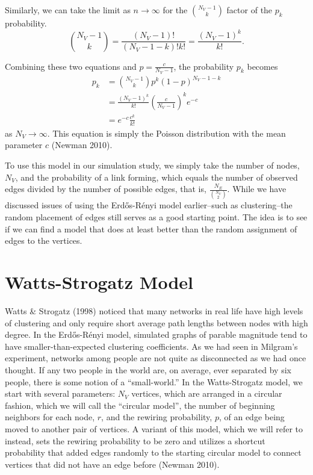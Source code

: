 \documentclass[12pt,twoside]{amherstthesis}
\begin{document}
  Similarly, we can take the limit as \(n \to \infty\) for the
  \({N_{V} - 1 \choose k}\) factor of the \(p_k\) probability.
  \[{N_{V} - 1 \choose k} = \frac {(N_{V} - 1)!} {(N_{V} - 1 - k)!k!} = \frac {(N_{V} - 1)^{k}} {k!}.\]
  
  Combining these two equations and \(p = \frac {c} {N_{V} - 1}\), the
  probability \(p_{k}\) becomes \[
  \begin{aligned}
  p_{k} &= {N_{V} -1 \choose k}p^{k}(1 - p)^{N_{V} - 1 - k} \\
  &= \frac {(N_{V} - 1)^{k}} {k!}\left(\frac {c} {N_{V} - 1}\right)^{k}e^{-c} \\
  &= e^{-c} \frac{c^{k}} {k!}
  \end{aligned}
  \] as \(N_{V} \to \infty\). This equation is simply the Poisson
  distribution with the mean parameter \(c\) (Newman 2010).
  
  To use this model in our simulation study, we simply take the number of
  nodes, \(N_{V}\), and the probability of a link forming, which equals
  the number of observed edges divided by the number of possible edges,
  that is, \(\frac{N_{E}} {{N_{V} \choose 2}}\). While we have discussed
  issues of using the Erdős-Rényi model earlier--such as clustering--the
  random placement of edges still serves as a good starting point. The
  idea is to see if we can find a model that does at least better than the
  random assignment of edges to the vertices.
  
  \section{Watts-Strogatz Model}\label{watts-strogatz-model}
  
  Watts \& Strogatz (1998) noticed that many networks in real life have
  high levels of clustering and only require short average path lengths
  between nodes with high degree. In the Erdős-Rényi model, simulated
  graphs of parable magnitude tend to have smaller-than-expected
  clustering coefficients. As we had seen in Milgram's experiment,
  networks among people are not quite as disconnected as we had once
  thought. If any two people in the world are, on average, ever separated
  by six people, there is some notion of a ``small-world.'' In the
  Watts-Strogatz model, we start with several parameters: \(N_V\)
  vertices, which are arranged in a circular fashion, which we will call
  the ``circular model'', the number of beginning neighbors for each node,
  \(r\), and the rewiring probability, \(p\), of an edge being moved to
  another pair of vertices. A variant of this model, which we will refer
  to instead, sets the rewiring probability to be zero and utilizes a
  shortcut probability that added edges randomly to the starting circular
  model to connect vertices that did not have an edge before (Newman
  2010).
  
\end{document}
